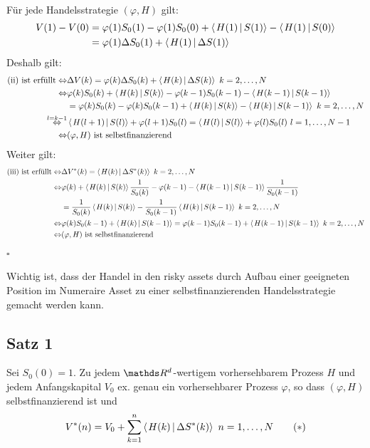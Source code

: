 \\
Für jede Handelsstrategie $(\varphi,H)$ gilt:
\begin{equation*}
\begin{aligned}
	V(1)-V(0) &= \varphi(1)S_0(1)-\varphi(1)S_0(0)+\sprod{H(1)}{S(1)}-\sprod{H(1)}{S(0)}\\
	&= \varphi(1)\Delta S_0(1)+\sprod{H(1)}{\Delta S(1)}
\end{aligned}
\end{equation*}
Deshalb gilt: 
\begin{equation*}
\begin{aligned}
	\text{(ii) ist erfüllt} \Leftrightarrow &\Delta V(k)=\varphi(k)\Delta S_0(k)+\sprod{H(k)}{\Delta S(k)}~k=2,\dots,N\\
	\Leftrightarrow &\varphi(k)S_0(k)+\sprod{H(k)}{S(k)}- \varphi(k-1)S_0(k-1)-\sprod{H(k-1)}{S(k-1)}\\
	&=\varphi(k)S_0(k)-\varphi(k)S_0(k-1)+\sprod{H(k)}{S(k)}-\sprod{H(k)}{S(k-1)}~k=2,\dots,N\\
	\stackrel{l=k-1}{\Leftrightarrow} &\sprod{H(l+1)}{S(l)}+\varphi(l+1)S_0(l)=\sprod{H(l)}{S(l)}+\varphi(l)S_0(l)~l=1,\dots,N-1\\
	\Leftrightarrow &(\varphi,H) \text{ ist selbstfinanzierend}
\end{aligned}
\end{equation*}
Weiter gilt:
\begin{equation*}
\begin{aligned}
	\text{(iii) ist erfüllt} \Leftrightarrow &\Delta V^*(k)=\sprod{H(k)}{\Delta S^*(k)}~ k=2,\dots,N\\
	\Leftrightarrow &\varphi(k)+\sprod{H(k)}{S(k)}\frac{1}{S_0(k)}-\varphi(k-1)-\sprod{H(k-1)}{S(k-1)}\frac{1}{S_0(k-1)}\\
	&=\frac{1}{S_0(k)}\sprod{H(k)}{S(k)}-\frac{1}{S_0(k-1)}\sprod{H(k)}{S(k-1)}~ k=2,\dots,N\\
	\Leftrightarrow &\varphi(k)S_0(k-1)+\sprod{H(k)}{S(k-1)}= \varphi(k-1)S_0(k-1)+\sprod{H(k-1)}{S(k-1)}~ k=2,\dots,N\\
	\Leftrightarrow &(\varphi,H) \text{ ist selbstfinanzierend}
\end{aligned}
\end{equation*}
\hfill $\square$

Wichtig ist, dass der Handel in den risky assets durch Aufbau einer geeigneten Position im Numeraire Asset zu einer selbstfinanzierenden Handelsstrategie gemacht werden kann.

\subsection{Satz 1}
\label{sub:satz_1fima}
Sei $S_0(0)=1$. Zu jedem $\R^d$-wertigem vorhersehbarem Prozess $H$ und jedem Anfangskapital $V_0$ ex. genau ein vorhersehbarer Prozess $\varphi$, so dass $(\varphi,H)$ selbstfinanzierend ist und 
\[
V^*(n)= V_0+\sum_{k=1}^{n}\sprod{H(k)}{\Delta S^*(k)}~n=1,\dots,N \tag*{$(\ast)$}
\]

